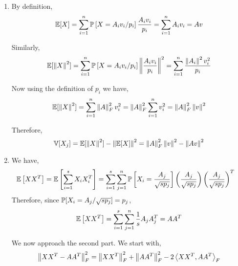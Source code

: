 \documentclass[10pt]{article}
\begin{document}
\begin{solution}[Solution]
\begin{enumerate}[label=(\alph*)]
    \item
        By definition,
        \begin{align*}
            \mathbb{E}[X] = \sum_{i=1}^{n} \mathbb{P}\left[X = A_iv_i/p_i\right]  \frac{A_{i}v_i}{p_i} = \sum_{i=1}^{n} A_{i}v_i = Av
        \end{align*}

        
        Similarly,
        \begin{align*}
            \mathbb{E}[\left\lVert X\right\rVert^2] = \sum_{i=1}^{n} \mathbb{P}\left[X = A_iv_i/p_i\right] \left\lVert\frac{A_{i}v_i}{p_i}\right\rVert^2 
            = \sum_{i=1}^{n} \frac{\left\lVert A_{i}\right\rVert^2v_i^2}{p_i}
        \end{align*}
        
        Now using the definition of \( p_i \) we have,
        \begin{align*}
            \mathbb{E}[\left\lVert X\right\rVert^2] = \sum_{i=1}^{n} \left\lVert A\right\rVert_F^2 v_i^2
            = \left\lVert A\right\rVert_F^2 \sum_{i=1}^{n} v_i^2
            = \left\lVert A\right\rVert_F^2\left\lVert v\right\rVert^2
        \end{align*}
        
        Therefore,
        \begin{align*}
            \mathbb{V}[X_j] = \mathbb{E}[\left\lVert X\right\rVert^2] -\left\lVert\mathbb{E}[X]\right\rVert^2
            = \left\lVert A\right\rVert_F^2\left\lVert v\right\rVert^2 - \left\lVert Av\right\rVert^2
        \end{align*}
        


    \item

        We have,
        \begin{align*}
            \mathbb{E} \left[ XX^T \right]
            = \mathbb{E} \left[ \sum_{i=1}^{s} X_iX_i^T \right]
            &=  \sum_{i=1}^{s} \sum_{j=1}^{n} \mathbb{P}\left[X_i = \frac{A_j}{\sqrt{sp_j}}\right] \left( \frac{A_j}{\sqrt{sp_j}} \right) \left( \frac{A_j}{\sqrt{sp_j}} \right)^T 
        \end{align*}
        Therefore, since \( \mathbb{P}[X_i = A_j / \sqrt{s p_j}] = p_j \),
        \begin{align*}    
            \mathbb{E} \left[ XX^T \right] 
            = \sum_{i=1}^{s} \sum_{j=1}^{n} \frac{1}{s} A_jA_j^T 
            = AA^T
        \end{align*}
       
        We now approach the second part. We start with,
        \begin{align*}
            \left\lVert XX^T - AA^T\right\rVert_F^2 = \left\lVert XX^T\right\rVert_F^2 + \left\lVert AA^T\right\rVert_F^2 - 2\left\langle XX^T,AA^T \right\rangle_F
        \end{align*}
        

\end{enumerate}
\end{solution}
\end{document}
